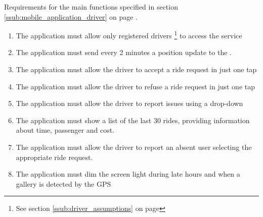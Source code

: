\subsubsection{}
Requirements for the main functions specified in section \ref{ssub:mobile_application_driver} on page \pageref{ssub:mobile_application_driver}.
\begin{enumerate}[resume*]
	\item The application must allow only registered drivers \footnote{See section \ref{ssub:driver_assumptions} on page \pageref{ssub:driver_assumptions}} to access the service
	\item The application must send every 2 minutes a position update to the .
	\item The application must allow the driver to accept a ride request in just one tap
	\item The application must allow the driver to refuse a ride request in just one tap
	\item The application must allow the driver to report issues using a drop-down 
	\item The application must show a list of the last 30 rides, providing information about time, passenger and cost.
	\item The application must allow the driver to report an absent user selecting the appropriate ride request.
	\item The application must dim the screen light during late hours and when a gallery is detected by the GPS

\end{enumerate}

